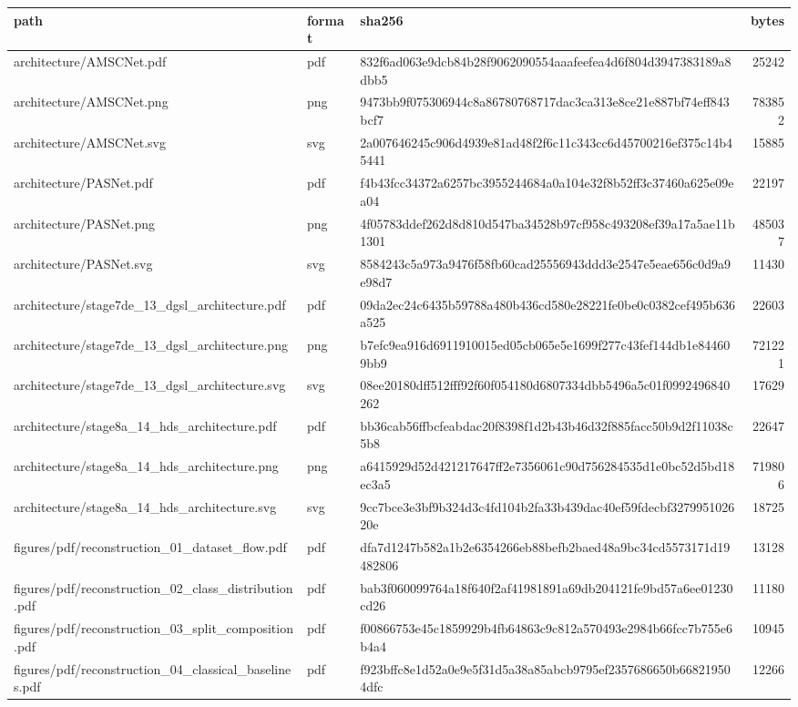 \begin{tabular}{lllr}
\toprule
path & format & sha256 & bytes \\
\midrule
architecture/AMSCNet.pdf & pdf & 832f6ad063e9dcb84b28f9062090554aaafeefea4d6f804d3947383189a8dbb5 & 25242 \\
architecture/AMSCNet.png & png & 9473bb9f075306944c8a86780768717dac3ca313e8ce21e887bf74eff843bcf7 & 783852 \\
architecture/AMSCNet.svg & svg & 2a007646245c906d4939e81ad48f2f6c11c343cc6d45700216ef375c14b45441 & 15885 \\
architecture/PASNet.pdf & pdf & f4b43fcc34372a6257bc3955244684a0a104e32f8b52ff3c37460a625e09ea04 & 22197 \\
architecture/PASNet.png & png & 4f05783ddef262d8d810d547ba34528b97cf958c493208ef39a17a5ae11b1301 & 485037 \\
architecture/PASNet.svg & svg & 8584243c5a973a9476f58fb60cad25556943ddd3e2547e5eae656c0d9a9e98d7 & 11430 \\
architecture/stage7de_13_dgsl_architecture.pdf & pdf & 09da2ec24c6435b59788a480b436cd580e28221fe0be0c0382cef495b636a525 & 22603 \\
architecture/stage7de_13_dgsl_architecture.png & png & b7efc9ea916d6911910015ed05cb065e5e1699f277c43fef144db1e844609bb9 & 721221 \\
architecture/stage7de_13_dgsl_architecture.svg & svg & 08ee20180dff512fff92f60f054180d6807334dbb5496a5c01f0992496840262 & 17629 \\
architecture/stage8a_14_hds_architecture.pdf & pdf & bb36cab56ffbcfeabdac20f8398f1d2b43b46d32f885facc50b9d2f11038c5b8 & 22647 \\
architecture/stage8a_14_hds_architecture.png & png & a6415929d52d421217647ff2e7356061c90d756284535d1e0bc52d5bd18ec3a5 & 719806 \\
architecture/stage8a_14_hds_architecture.svg & svg & 9cc7bce3e3bf9b324d3c4fd104b2fa33b439dac40ef59fdecbf327995102620e & 18725 \\
figures/pdf/reconstruction_01_dataset_flow.pdf & pdf & dfa7d1247b582a1b2e6354266eb88befb2baed48a9bc34cd5573171d19482806 & 13128 \\
figures/pdf/reconstruction_02_class_distribution.pdf & pdf & bab3f060099764a18f640f2af41981891a69db204121fe9bd57a6ee01230cd26 & 11180 \\
figures/pdf/reconstruction_03_split_composition.pdf & pdf & f00866753e45c1859929b4fb64863c9c812a570493e2984b66fcc7b755e6b4a4 & 10945 \\
figures/pdf/reconstruction_04_classical_baselines.pdf & pdf & f923bffc8e1d52a0e9e5f31d5a38a85abcb9795ef2357686650b668219504dfc & 12266 \\

\end{tabular}
